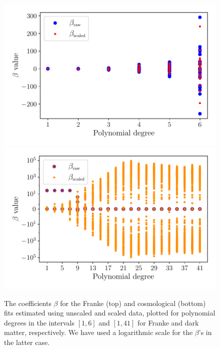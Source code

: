 \documentclass[aps,pra,english,notitlepage,reprint,nofootinbib]{revtex4-1}  %
\begin{document}
\begin{figure}
  \vspace*{-5pt}
  \centering %
  \includegraphics[trim = 0 1.3cm 0 0,clip,width=\columnwidth,keepaspectratio]{../figs/a_beta_scaled_vs_raw.pdf}
  \centering %
  \includegraphics[width=\columnwidth]{../figs/g_beta_scaled_vs_raw.pdf}
  \caption{The coefficients $\beta$ for the Franke (top) and cosmological (bottom) fits estimated using unscaled and scaled data, plotted for polynomial degrees in the intervals $[1,6]$ and $[1,41]$ for Franke and dark matter, respectively. We have used a logarithmic scale for the $\beta$'s in the latter case.}\label{fig:beta scaled vs raw}
  \vspace*{-5pt}
\end{figure}
\end{document}
